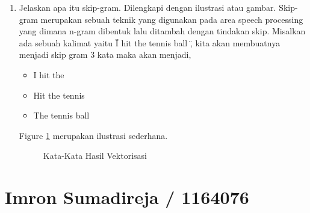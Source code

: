 \begin{enumerate}
\item Jelaskan apa itu skip-gram. Dilengkapi dengan ilustrasi atau gambar.
	\subitem Skip-gram merupakan sebuah teknik yang digunakan pada area speech processing yang dimana n-gram dibentuk lalu ditambah dengan tindakan skip. Misalkan ada sebuah kalimat yaitu \" I hit the tennis ball \", kita akan membuatnya menjadi skip gram 3 kata maka akan menjadi,
		\begin{itemize}
			\item I hit the
			\item Hit the tennis
			\item The tennis ball
		\end{itemize}
Figure \ref{YNC5-4} merupakan ilustrasi sederhana.
		\begin{figure}[ht]
		\caption{Kata-Kata Hasil Vektorisasi}
		\label{YNC5-4}
	\end{figure}

\end{enumerate}

\section{Imron Sumadireja / 1164076}
